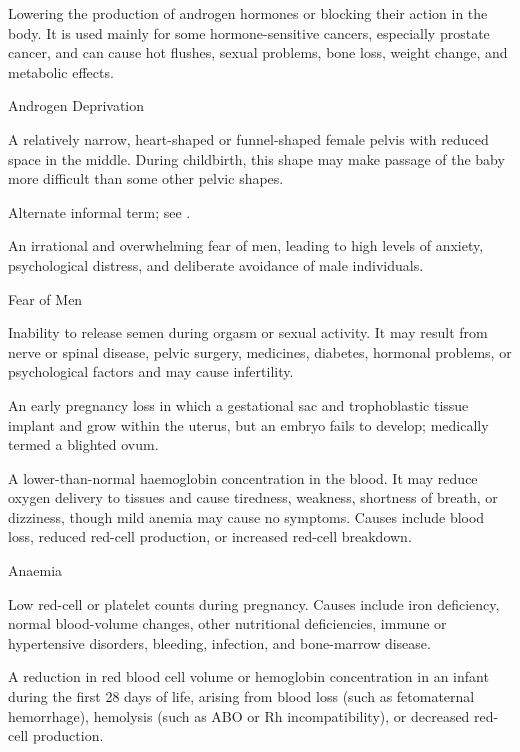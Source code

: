  Lowering the production of androgen hormones or blocking their action in the body. It is used mainly for some hormone-sensitive cancers, especially prostate cancer, and can cause hot flushes, sexual problems, bone loss, weight change, and metabolic effects.

\synonyms
Androgen Deprivation

 A relatively narrow, heart-shaped or funnel-shaped female pelvis with reduced space in the middle. During childbirth, this shape may make passage of the baby more difficult than some other pelvic shapes.

 Alternate informal term; see .

 An irrational and overwhelming fear of men, leading to high levels of anxiety, psychological distress, and deliberate avoidance of male individuals.

\synonyms
Fear of Men

 Inability to release semen during orgasm or sexual activity. It may result from nerve or spinal disease, pelvic surgery, medicines, diabetes, hormonal problems, or psychological factors and may cause infertility.

 An early pregnancy loss in which a gestational sac and trophoblastic tissue implant and grow within the uterus, but an embryo fails to develop; medically termed a blighted ovum.

 A lower-than-normal haemoglobin concentration in the blood. It may reduce oxygen delivery to tissues and cause tiredness, weakness, shortness of breath, or dizziness, though mild anemia may cause no symptoms. Causes include blood loss, reduced red-cell production, or increased red-cell breakdown.

\synonyms
Anaemia

 Low red-cell or platelet
counts during pregnancy. Causes include iron deficiency, normal blood-volume
changes, other nutritional deficiencies, immune or hypertensive disorders,
bleeding, infection, and bone-marrow disease.

 A reduction in red blood cell volume or hemoglobin concentration in an infant during the first 28 days of life, arising from blood loss (such as fetomaternal hemorrhage), hemolysis (such as ABO or Rh incompatibility), or decreased red-cell production.

